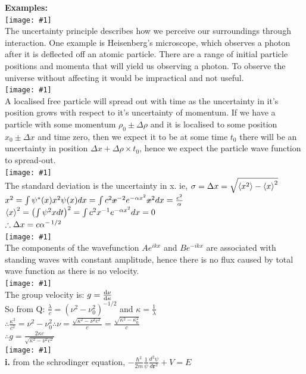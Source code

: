 \documentclass[10pt,landscape,a4paper]{article}
\newcommand{\inlineimagesize}[2]{\texttt{[image: \#1]}\\}
\newcommand{\tise}{\ensuremath{-\frac{\hbar^2}{2m}\frac{1}{\psi}\frac{d^2\psi}{d\textbf{r}^2} + V = E}}
\newcommand{\minititle}[1]{\textbf{#1:}\\}
\renewcommand{\^}[1]{\ensuremath{\hat{#1}}}
\renewcommand{\-}[1]{\text{\sout{\ensuremath{#1}}}}
\begin{document}
	\begin{multicols}{3}
		\minititle{Examples}
		\inlineimagesize{q1ai.png}{0.3}
		The uncertainty principle describes how we perceive our surroundings through interaction. One example is Heisenberg's microscope, which observes a photon after it is deflected off an atomic particle. There are a range of initial particle positions and momenta that will yield us observing a photon. To observe the universe without affecting it would be impractical and not useful.\\
		\inlineimagesize{q1aii.png}{0.3}
		A localised free particle will spread out with time as the uncertainty in it's position grows with respect to it's uncertainty of momentum. If we have a particle with some momentum $ \rho_0\pm\Delta\rho $ and it is localised to some position $ x_0\pm\Delta x $ and time zero, then we expect it to be at some time $ t_0 $ there will be an uncertainty in position $ \Delta x+\Delta\rho\times t_0 $, hence we expect the particle wave function to spread-out.\\
		\inlineimagesize{q1aiii.png}{0.3}
		The standard deviation is the uncertainty in x. ie,
		$ \sigma = \Delta x = \sqrt{\expval{x^2}-\expval{x}^2} $\\
		$ x^2 = \int\psi^*(x)x^2\psi(x)dx = \int c^2\-x^{-2}e^{-\alpha x^2}\-x^2dx = \frac{c^2}{\alpha} $\\
		$ \expval{x}^2 = \left(\int\psi^2xdt\right)^2 = \int c^2x^{-1}e^{-\alpha x^2}dx = 0 $\\
		$ \therefore \Delta x = c\alpha^{-\flatfrac{1}{2}} $\\
		\inlineimagesize{q1aiv.png}{0.3}
		The components of the wavefunction $ Ae^{ikx} $ and $ Be^{-ikx} $ are associated with  standing waves with constant amplitude, hence there is no flux caused by total wave function as there is no velocity. \\
		\inlineimagesize{q1av.png}{0.3}
		The group velocity is: $ g = \dv{\nu}{\kappa} $\\
		So from Q: $ \frac{\lambda}{c} = (\nu^2-\nu_0^2)^{-1/2} $ and $ \kappa = \frac{1}{\lambda} $\\
		$ \therefore \frac{\kappa^2}{c^2} = \nu^2-\nu_0^2 \therefore \nu = \frac{\sqrt{\kappa^2-\nu^2c^2}}{c} = \frac{\sqrt{\kappa^2-\kappa_0^2}}{c} $\\
		$ \therefore g = \frac{2\kappa c}{\sqrt{\kappa^2-\nu^2c^2}} $\\
		\inlineimagesize{q1b.png}{0.3}
		\textbf{i.} from the schrodinger equation, \tise \\

\end{multicols}
\end{document}
